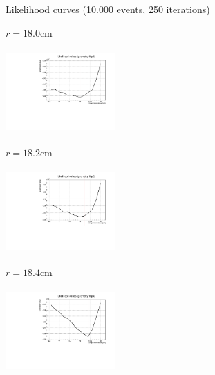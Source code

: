 \documentclass[handout,8 pt]{beamer}
\begin{document}
\begin{frame}{Likelihood curves (10.000 events, 250 iterations)}
\justifying
\begin{minipage}[c]{.32\textwidth}
\begin{exampleblock}{} \begin{center}$r = 18.0$cm\end{center} \end{exampleblock}
\includegraphics[width=4.2cm, height=3.2cm]{figs/likelihood250LowStat/likelihood18p0.pdf} 
\end{minipage}
\begin{minipage}[c]{.32\textwidth}
\begin{exampleblock}{} \begin{center}$r = 18.2$cm\end{center} \end{exampleblock}
\includegraphics[width=4.2cm, height=3.2cm]{figs/likelihood250LowStat/likelihood18p2.pdf} 
\end{minipage}
\begin{minipage}[c]{.32\textwidth}
\begin{exampleblock}{} \begin{center}$r = 18.4$cm\end{center} \end{exampleblock}
\includegraphics[width=4.2cm, height=3.2cm]{figs/likelihood250LowStat/likelihood18p4.pdf} 
\end{minipage}


\end{frame}
\end{document}
